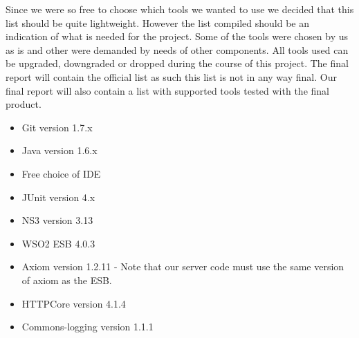     Since we were so free to choose which tools we wanted to use we decided that this list should be quite lightweight. However the list compiled should be an indication of what is needed for the project. Some of the tools were chosen by us as is and other were demanded by needs of other components. All tools used can be  upgraded, downgraded or dropped during the course of this project. The final report will contain the official list as such this list is not in any way final. Our final report will also contain a list with supported tools tested with the final product.
    \begin{itemize}
        \item Git version 1.7.x
        \item Java version 1.6.x
        \item Free choice of IDE
        \item JUnit version 4.x
        \item NS3 version 3.13
        \item WSO2 ESB 4.0.3
        \item Axiom version 1.2.11  -  Note that our server code must use the same version of axiom as the ESB.
	\item HTTPCore version 4.1.4
	\item Commons-logging version 1.1.1
    \end{itemize}
    

